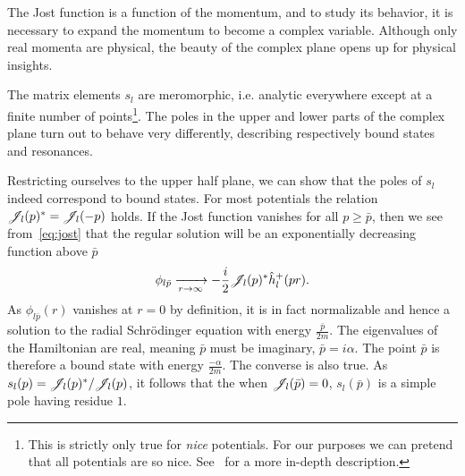 The Jost function is a function of the momentum, and to study its behavior, it
is necessary to expand the momentum to become a complex variable. Although only
real momenta are physical, the beauty of the complex plane opens up for 
physical insights.

\newcommand{\imag}{\mathfrak{Im}}
The matrix elements \(s_{l}\) are meromorphic, i.e. analytic everywhere except
at a finite number of points\footnote{This is strictly only true for
  \textit{nice} potentials. For our purposes we can pretend that all potentials
  are so nice. See~\cite[p.~220]{taylor} for a more in-depth description.}. The
poles in the upper and lower parts of the complex plane turn out to behave very differently,
describing respectively bound states and resonances.

Restricting ourselves to
the upper half plane, we can show that the poles of \(s_{l}\) indeed correspond to
bound states. For most potentials the relation \(\mathscr{J}_{l}(p)^{*}=\mathscr{J}_{l}(-p)\) holds. If the Jost
function vanishes for all \(p\ge \bar{p}\), then we see from~\eqref{eq:jost} that
the regular solution will be an exponentially decreasing function above
\(\bar{p}\)
\begin{equation*}
  \phi_{l\bar{p}}\xrightarrow[r\to\infty]{}-\frac{i}{2}\mathscr{J}_{l}(p)^{*}\hat{h}^{+}_{l}(pr).
\end{equation*}
As \(\phi_{l\bar{p}}(r)\) vanishes at \(r=0\) by definition, it is in
fact normalizable and hence a solution to the radial Schr\"odinger equation with
energy \(\frac{\bar{p}}{2m}\). The eigenvalues
of the Hamiltonian are real,  meaning \(\bar{p}\) must be imaginary,
\(\bar{p}=i\alpha\). The point \(\bar{p}\) is therefore a bound state with
energy \(\frac{-\alpha}{2m}\). The converse is also true\cite[p.~224]{taylor}.
As \(s_{l}(p)=\mathscr{J}_{l}(p)^{*}/\mathscr{J}_{l}(p)\), it follows that the when
\(\mathscr{J}_{l}(\bar{p})=0\), \(s_{l}(\bar{p})\) is a simple pole
having residue \(1\).



